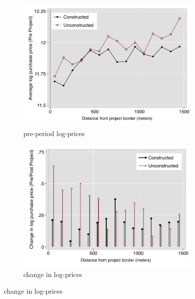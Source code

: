 \documentclass[12pt]{article}
\begin{document}
\begin{figure}[t!]
        \centering
        \caption[ House prices outside constructed and unconstructed projects ]
        {\small House prices outside constructed and unconstructed projects } 
        \begin{subfigure}[b]{0.495\textwidth}
            \centering
            \includegraphics[width=\textwidth,trim={0.9cm .3cm 0.1cm 0cm}, clip=true]{figures/price_pre_means_4}
            \caption[Network2]%
            {{\small pre-period log-prices }}    
            \label{fig:preprice}
        \end{subfigure}
        \hfill
        \begin{subfigure}[b]{0.495\textwidth}   
            \centering 
            \includegraphics[width=\textwidth,trim={0.9cm .3cm 0.1cm 0cm}, clip=true]{figures/price_rawchanges_4}
            \caption[]%
            {{\small change in log-prices}}    
            \label{fig:changeprice}
        \end{subfigure}
        \label{fig:rawpricemeans}
        \vspace{-6mm}
\end{figure} 
\end{document}
